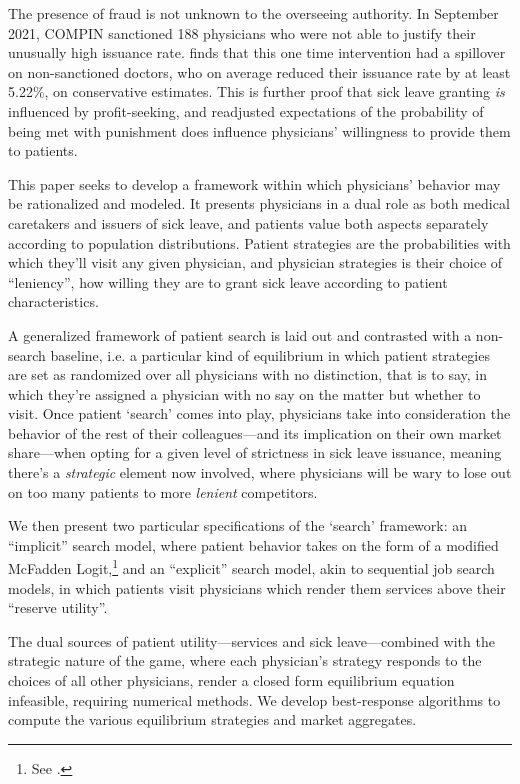 \documentclass[../main.tex]{subfiles}
\begin{document}
The presence of fraud is not unknown to the overseeing authority. In September 2021, COMPIN sanctioned 188 physicians who were not able to justify their unusually high issuance rate. \cite{oteiza} finds that this one time intervention had a spillover on non-sanctioned doctors, who on average reduced their issuance rate by at least 5.22\%, on conservative estimates. This is further proof that sick leave granting \textit{is} influenced by profit-seeking, and readjusted expectations of the probability of being met with punishment does influence physicians' willingness to provide them to patients.

This paper seeks to develop a framework within which physicians' behavior may be rationalized and modeled. It presents physicians in a dual role as both medical caretakers and issuers of sick leave, and patients value both aspects separately according to population distributions. Patient strategies are the probabilities with which they'll visit any given physician, and physician strategies is their choice of ``leniency'', how willing they are to grant sick leave according to patient characteristics.

A generalized framework of patient search is laid out and contrasted with a non-search baseline, i.e. a particular kind of equilibrium in which patient strategies are set as randomized over all physicians with no distinction, that is to say, in which they're assigned a physician with no say on the matter but whether to visit. Once patient `search' comes into play, physicians take into consideration the behavior of the rest of their colleagues—and its implication on their own market share—when opting for a given level of strictness in sick leave issuance, meaning there's a \textit{strategic} element now involved, where physicians will be wary to lose out on too many patients to more \textit{lenient} competitors.

We then present two particular specifications of the `search' framework: an ``implicit'' search model, where patient behavior takes on the form of a modified McFadden Logit,\footnote{See \cite{mcfadden}.} and an ``explicit'' search model, akin to sequential job search models, in which patients visit physicians which render them services above their ``reserve utility''.

The dual sources of patient utility—services and sick leave—combined with the strategic nature of the game, where each physician's strategy responds to the choices of all other physicians, render a closed form equilibrium equation infeasible, requiring numerical methods. We develop best-response algorithms to compute the various equilibrium strategies and market aggregates.
\end{document}
